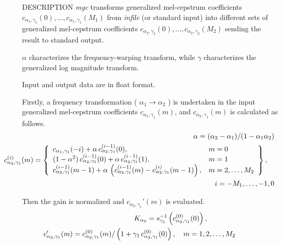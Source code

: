 \begin{qsection}{DESCRIPTION}
{\em mgc} transforms generalized mel-cepstrum coefficients
$c_{\alpha_1,\gamma_1}(0),\ldots,c_{\alpha_1,\gamma_1}(M_1)$
from {\em infile} (or standard input) 
into different sets of generalized mel-cepstrum coefficients
$c_{\alpha_2,\gamma_2}(0),\ldots,c_{\alpha_2,\gamma_2}(M_2)$
sending the result to standard output.

$\alpha$ characterizes the frequency-warping transform,
while $\gamma$ characterizes the generalized log magnitude transform.

Input and output data are in float format.

Firstly, a frequency transformation ( $\alpha_1 \rightarrow \alpha_2$ )
is undertaken in the input generalized mel-cepstrum
coefficients $c_{\alpha_1,\gamma_1}(m)$,
and $c_{\alpha_2,\gamma_1}(m)$ is calculated as follows.
\begin{eqnarray*} 
\hspace{-15mm}&& \alpha = (\alpha_2-\alpha_1)/(1-\alpha_1\alpha_2) \\
\hspace{-15mm}&& c_{\alpha_2,\gamma_1}^{(i)}(m) = \left\{ 
	\begin{array}{ll}
          c_{\alpha_1,\gamma_1}(-i)
	    +\alpha\,c_{\alpha_2,\gamma_1}^{(i-1)}(0), &  m=0 \\
          (1-\alpha^2)\,c_{\alpha_2,\gamma_1}^{(i-1)}(0)
            +\alpha\,c_{\alpha_2,\gamma_1}^{(i-1)}(1), &  m=1 \\
          c_{\alpha_2,\gamma_1}^{(i-1)}(m-1) 
	    +\alpha\, \left(c_{\alpha_2,\gamma_1}^{(i-1)}(m)
	    -c_{\alpha_2,\gamma_1}^{(i)}(m-1)\right), &   m=2,\ldots,M_2
         \end{array} \right\}, \quad \nonumber \\
\hspace{-15mm}&& \hspace{80mm} i = -M_1,\ldots,-1,0 
\end{eqnarray*}

Then the gain is normalized and $c_{\alpha_2,\gamma_1}'(m)$ 
is evaluated.
\begin{eqnarray*}
\hspace{-15mm}&&K_{\alpha_2} = 
	s_{\gamma_1}^{-1}\left(c_{\alpha_2,\gamma_1}^{(0)}(0)\right), 
	  \qquad\qquad \\ 
\hspace{-15mm}&&c_{\alpha_2,\gamma_1}'(m) =
          c_{\alpha_2,\gamma_1}^{(0)}(m)/\left(1+\gamma_1\,
	  c_{\alpha_2,\gamma_1}^{(0)}(0)\right), \quad m = 1,2,\ldots, M_2 
\end{eqnarray*}


\end{qsection}
